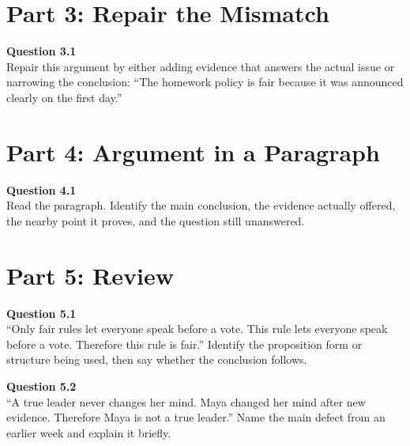 \documentclass[12pt]{article}
\begin{document}

\newpage

\section*{Part 3: Repair the Mismatch}

\textbf{Question 3.1}\\[-0.15em]
Repair this argument by either adding evidence that answers the actual issue or narrowing the conclusion: ``The homework policy is fair because it was announced clearly on the first day.''


\newpage

\section*{Part 4: Argument in a Paragraph}

\textbf{Question 4.1}\\[-0.15em]
Read the paragraph. Identify the main conclusion, the evidence actually offered, the nearby point it proves, and the question still unanswered.

\vspace{0.2em}

\noindent{}


\newpage

\section*{Part 5: Review}

\textbf{Question 5.1}\\[-0.15em]
``Only fair rules let everyone speak before a vote. This rule lets everyone speak before a vote. Therefore this rule is fair.'' Identify the proposition form or structure being used, then say whether the conclusion follows.


\textbf{Question 5.2}\\[-0.15em]
``A true leader never changes her mind. Maya changed her mind after new evidence. Therefore Maya is not a true leader.'' Name the main defect from an earlier week and explain it briefly.

\end{document}
